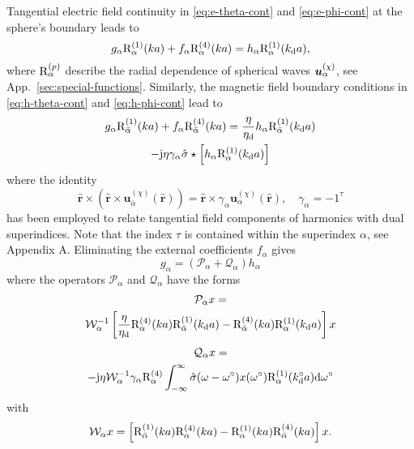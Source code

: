 \documentclass[article]{IEEEtran}
\newcommand{\T}[1]{\mathrm{#1}}
\newcommand{\V}[1]{\boldsymbol{#1}}
\renewcommand{\u}[1]{\boldsymbol{\hat{#1}}}
\newcommand{\rbkind}{\chi}
\newcommand{\Xopchar}{P}
\newcommand{\Yopchar}{Q}
\newcommand{\Xop}{\mathcal{\Xopchar}}
\newcommand{\Yop}{\mathcal{\Yopchar}}
\begin{document}
Tangential electric field continuity in \eqref{eq:e-theta-cont} and \eqref{eq:e-phi-cont} at the sphere's boundary leads to
\begin{equation}
    g_\alpha\Ra^{(1)}(ka) + f_\alpha \Ra^{(4)}(ka) = h_\alpha \Ra^{(1)}(k_\T{d}a),
    \label{eq:tmat-e-cont}
\end{equation}
where $\Ra^{(p)}$ describe the radial dependence of spherical waves $\uppa$, see App.~\ref{sec:special-functions}.  Similarly, the magnetic field boundary conditions in \eqref{eq:h-theta-cont} and \eqref{eq:h-phi-cont} lead to 
\begin{multline}
    g_\alpha \Rb^{(1)}(ka) + f_\alpha\Rb^{(4)}(ka) = \frac{\eta}{\eta_\T{d}}h_\alpha \Rb^{(1)}(k_\T{d}a) \\- \T{j}\eta\gamma_\alpha\hat{\sigma}\star\left[h_\alpha\Ra^{(1)}(k_\T{d}a)\right]
    \label{eq:tmat-h-cont}
\end{multline}
where the identity
\begin{equation}\label{eq:signconstdefn}
    \u{r}\times\left(\u{r}\times\V{u}^{(\rbkind)}_{\bar\alpha}(\u{r})\right) = \u{r}\times\gamma_\alpha\V{u}^{(\rbkind)}_{\alpha}(\u{r}),\quad \gamma_\alpha = -1^{\tau}
\end{equation}
has been employed to relate tangential field components of harmonics with dual superindices. Note that the index $\tau$ is contained within the superindex $\alpha$, see Appendix A. 
Eliminating the external coefficients $f_\alpha$ gives 
\begin{equation}
    g_\alpha = (\Xop_\alpha+\Yop_\alpha)h_\alpha
    \label{eq:tmat-op-eq}
\end{equation}
where the operators $\Xop_\alpha$ and $\Yop_\alpha$ have the forms
\begin{multline}
    \Xop_\alpha x = \\\mathcal{W}_\alpha^{-1}\left[\frac{\eta}{\eta_\T{d}}\Ra^{(4)}(ka)\Rb^{(1)}(k_\T{d}a) - \Rb^{(4)}(ka)\Ra^{(1)}(k_\T{d}a)\right]x
    \label{eq:w-alpha}
\end{multline}
\begin{multline}
    \Yop_\alpha x = \\
    -\T{j}\eta \mathcal{W}_\alpha^{-1}\gamma_\alpha\Ra^{(4)}\int_{-\infty}^\infty \hat{\sigma}(\omega-\omega^\circ)x(\omega^\circ)\Ra^{(1)}(k^\circ_\T{d}a) \T{d}\omega^\circ
\end{multline}
with
\begin{equation}
    \mathcal{W}_\alpha x = \left[\Rb^{(1)}(ka)\Ra^{(4)}(ka) - \Ra^{(1)}(ka)\Rb^{(4)}(ka)\right]x.
    \label{eq:wdef}
\end{equation}
\end{document}
